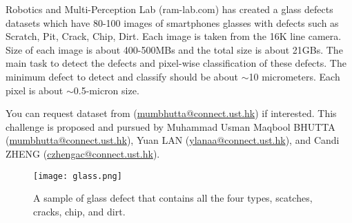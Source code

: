 \documentclass[11pt]{article}
\begin{document}
Robotics and Multi-Perception Lab (ram-lab.com) has created a glass defects datasets which have 80-100 images of smartphones glasses with defects such as Scratch, Pit, Crack, Chip, Dirt. Each image is taken from the 16K line camera. Size of each image is about 400-500MBs and the total size is about 21GBs. The main task to detect the defects and pixel-wise classification of these defects. The minimum defect to detect and classify should be about $\sim$10 micrometers.  Each pixel is about $\sim$0.5-micron size.

You can request dataset from (\url{mumbhutta@connect.ust.hk}) if interested. This challenge is proposed and pursued by Muhammad Usman Maqbool BHUTTA (\url{mumbhutta@connect.ust.hk}), Yuan LAN (\url{ylanaa@connect.ust.hk}), and Candi ZHENG (\url{czhengac@connect.ust.hk}).
\begin{figure}[htbp]
\begin{centering}
	\texttt{[image: glass.png]}  
	\caption{A sample of glass defect that contains all the four types, scatches, cracks, chip, and dirt.}
	\label{fig:heatmap}
\end{centering}
\end{figure}


%
%
\end{document}
